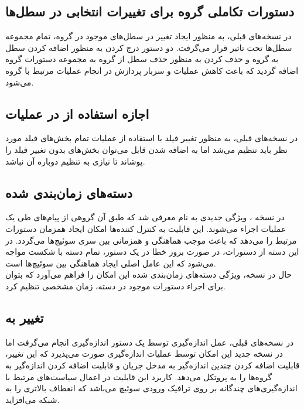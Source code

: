 \subsection{دستورات تکاملی گروه برای تغییرات انتخابی در سطل‌ها}
در نسخه‌های قبلی، به منظور ایجاد تغییر در سطل‌های موجود در گروه، تمام مجموعه سطل‌ها تحت تاثیر قرار می‌گرفت. دو دستور درج کردن به منظور اضافه کردن سطل به گروه و حذف کردن به منظور حذف سطل از گروه به مجموعه دستورات گروه اضافه گردید که باعث کاهش عملیات و سربار پردازش در انجام عملیات مرتبط با گروه می‌شود.

\subsection{اجازه استفاده از  در عملیات }
در نسخه‌های قبلی، به منظور تغییر فیلد با استفاده از عملیات  تمام بخش‌های فیلد مورد نظر باید تنظیم می‌شد اما به اضافه شدن قابل  می‌توان بخش‌های بدون تغییر فیلد را پوشاند تا نیازی به تنظیم دوباره آن نباشد.

\subsection{دسته‌های زمان‌بندی شده}
در نسخه ، ویژگی جدیدی به نام  معرفی شد که طبق آن گروهی از پیام‌های  طی یک عملیات اجراء می‌شوند. این قابلیت به کنترل کننده‌ها امکان ایجاد همزمان دستورات مرتبط را می‌دهد که باعث موجب هماهنگی و همزمانی بین سری سوئیچ‌ها می‌گردد. در این دسته از دستورات، در صورت بروز خطا در یک دستور، تمام دسته با شکست مواجه می‌شود که این عامل اصلی ایجاد هماهنگی بین سوئیچ‌ها است.\\
حال در نسخه، ویژگی دسته‌های زمان‌بندی شده این امکان را فراهم می‌آورد که بتوان برای اجراء دستورات موجود در دسته، زمان مشخصی تنظیم کرد.

\subsection{تغییر  به }
در نسخه‌های قبلی، عمل اندازه‌گیری توسط یک دستور اندازه‌گیری انجام می‌گرفت اما در نسخه جدید این امکان توسط عملیات اندازه‌گیری صورت می‌پذیرد که این تغییر، قابلیت اضافه کردن چندین اندازه‌گیر به مدخل جریان و قابلیت اضافه کردن اندازه‌گیر به گروه‌ها را به پروتکل می‌دهد. کاربرد این قابلیت در اعمال سیاست‌های مرتبط با اندازه‌گیری‌های چندگانه بر روی ترافیک ورودی سوئیچ می‌باشد که انعطاف بالاتری را به شبکه می‌افزاید.
\pagebreak


